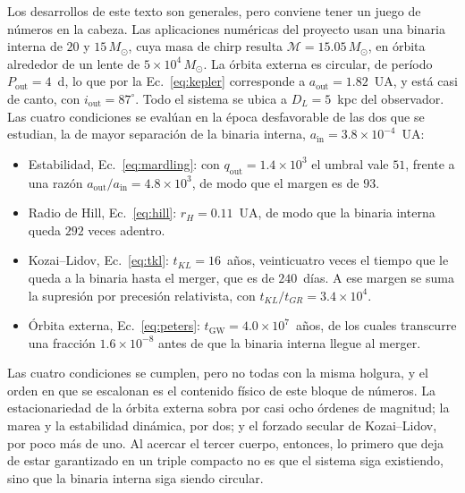 \documentclass[11pt,a4paper,openany]{book}
\newcommand{\Msun}{M_{\odot}}
\newcommand{\ain}{a_{\mathrm{in}}}
\newcommand{\aout}{a_{\mathrm{out}}}
\begin{document}
\begin{ejemplo}[title={El triple concreto de este proyecto}]
Los desarrollos de este texto son generales, pero conviene tener un juego de
n\'umeros en la cabeza. Las aplicaciones num\'ericas del proyecto usan una
binaria interna de $20$ y $15\,\Msun$, cuya masa de chirp resulta
$\mathcal{M}=15.05\,\Msun$, en \'orbita alrededor de un lente de
$5\times10^{4}\,\Msun$. La \'orbita externa es circular, de per\'iodo
$P_\mathrm{out}=4$~d, lo que por la Ec.~\eqref{eq:kepler} corresponde a
$\aout=1.82$~UA, y est\'a casi de canto, con
$i_\mathrm{out}=87^{\circ}$. Todo el sistema se ubica a $D_L=5$~kpc del
observador. Las cuatro condiciones se eval\'uan en la \'epoca desfavorable de
las dos que se estudian, la de mayor separaci\'on de la binaria interna,
$\ain=3.8\times10^{-4}$~UA:
\begin{itemize}\itemsep2pt
  \item Estabilidad, Ec.~\eqref{eq:mardling}: con $q_\mathrm{out}=1.4\times10^{3}$
    el umbral vale $51$, frente a una raz\'on $\aout/\ain=4.8\times10^{3}$,
    de modo que el margen es de $93$.
  \item Radio de Hill, Ec.~\eqref{eq:hill}: $r_H=0.11$~UA, de modo que la
    binaria interna queda $292$ veces adentro.
  \item Kozai--Lidov, Ec.~\eqref{eq:tkl}: $t_{KL}=16$~a\~nos, veinticuatro
    veces el tiempo que le queda a la binaria hasta el merger, que es de
    $240$~d\'ias. A ese margen se suma la supresi\'on por precesi\'on
    relativista, con $t_{KL}/t_{GR}=3.4\times10^{4}$.
  \item \'Orbita externa, Ec.~\eqref{eq:peters}:
    $t_\mathrm{GW}=4.0\times10^{7}$~a\~nos, de los cuales transcurre una
    fracci\'on $1.6\times10^{-8}$ antes de que la binaria interna llegue al
    merger.
\end{itemize}
Las cuatro condiciones se cumplen, pero no todas con la misma holgura, y el
orden en que se escalonan es el contenido f\'isico de este bloque de
n\'umeros. La estacionariedad de la \'orbita externa sobra por casi ocho
\'ordenes de magnitud; la marea y la estabilidad din\'amica, por dos; y el
forzado secular de Kozai--Lidov, por poco m\'as de uno. Al acercar el tercer cuerpo, entonces,
lo primero que deja de estar garantizado en un triple compacto no es que el
sistema siga existiendo, sino que la binaria interna siga siendo circular.
\end{ejemplo}

\end{document}
